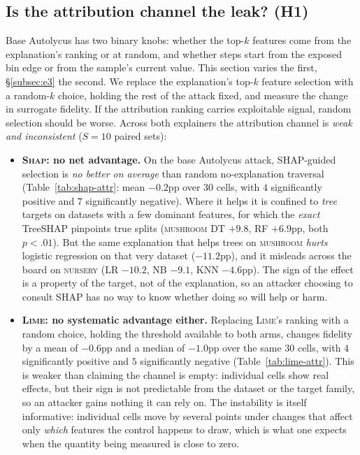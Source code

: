 \documentclass[sigconf,anonymous,review]{acmart}
\begin{document}
\subsection{Is the attribution channel the leak? (H1)}
\label{subsec:e2}
Base Autolycus has two binary knobs: whether the top-$k$ features come from the explanation's ranking
or at random, and whether steps start from the exposed bin edge or from the sample's current value.
This section varies the first, \S\ref{subsec:e3} the second. We replace the explanation's top-$k$
feature selection with a random-$k$ choice, holding the rest of the attack fixed, and measure the
change in surrogate fidelity. If the attribution ranking carries exploitable signal, random selection should
be worse. Across both explainers the attribution channel is \emph{weak and inconsistent} ($S{=}10$
paired sets):
\begin{itemize}
  \item \textbf{\textsc{Shap}: no net advantage.} On the base Autolycus attack, SHAP-guided selection
  is \emph{no better on average} than random no-explanation traversal (Table~\ref{tab:shap-attr}: mean $-0.2$pp over $30$ cells, with $4$ significantly positive and $7$ significantly negative). Where it
  helps it is confined to \emph{tree} targets on datasets with a few dominant features, for which the
  \emph{exact} TreeSHAP pinpoints true splits (\textsc{mushroom} DT $+9.8$, RF $+6.9$pp, both
  $p{<}.01$). But the same explanation that helps trees on
  \textsc{mushroom} \emph{hurts} logistic regression on that very dataset ($-11.2$pp), and it misleads
  across the board on \textsc{nursery} (LR $-10.2$, NB $-9.1$, KNN $-4.6$pp). The sign of the effect is
  a property of the target, not of the explanation, so an attacker choosing to consult SHAP has no way
  to know whether doing so will help or harm.
  \item \textbf{\textsc{Lime}: no systematic advantage either.} Replacing \textsc{Lime}'s ranking with a random choice, holding the threshold available to both arms, changes fidelity by a mean of
  $-0.6$pp and a median of $-1.0$pp over the same $30$ cells, with $4$ significantly positive and $5$
  significantly negative (Table~\ref{tab:lime-attr}). This is weaker than claiming the channel is empty: individual cells
  show real effects, but their sign is not predictable from the dataset or the target family, so an
  attacker gains nothing it can rely on. The instability is itself informative: individual cells move
  by several points under changes that affect only \emph{which} features the control happens to draw,
  which is what one expects when the quantity being measured is close to zero.
\end{itemize}
\end{document}
